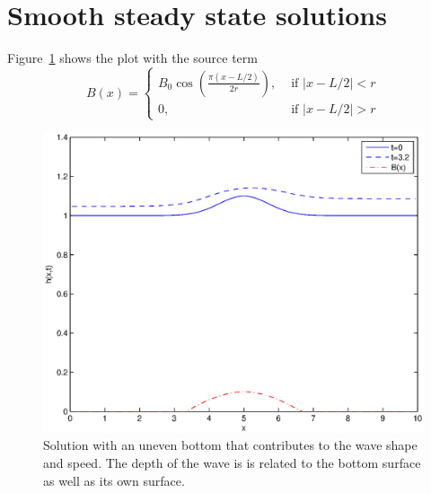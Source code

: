 

\section{Smooth steady state solutions} %
\label{sec:smooth_steady_state_solutions}
Figure~\ref{fig:Figures_steadySolutionsp1_n_is_80_a_0} shows the plot with the source term
\begin{equation}
	B(x) = \begin{cases}
		B_0 \cos \left( \frac{\pi(x-L/2)}{2r} \right), &\text{ if }|x-L/2|<r\\
		0, &\text{ if }|x-L/2|>r
	\end{cases}
	\label{eq:bxEquation}
\end{equation} %
\begin{figure}[htbp]
	\centering
		\includegraphics[width=\MyWidth]{Figures/steadySolutionsp1_n_is_80_a_0.eps}
	\caption{Solution with an uneven bottom that contributes to the wave shape and speed.  The depth of the wave is is related to the bottom surface as well as its own surface.} 
	\label{fig:Figures_steadySolutionsp1_n_is_80_a_0}
\end{figure}%

